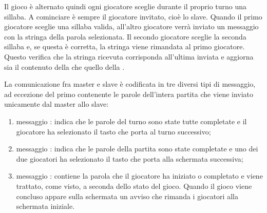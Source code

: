 
Il gioco è alternato quindi ogni giocatore sceglie durante il proprio turno una sillaba. A cominciare è sempre il giocatore invitato, cioè lo slave. Quando il primo giocatore sceglie una sillaba valida, all'altro giocatore verrà inviato un messaggio con la stringa della parola selezionata. Il secondo giocatore sceglie la seconda sillaba e, se questa è corretta, la stringa viene rimandata al primo giocatore. Questo verifica che la stringa ricevuta corrisponda all'ultima inviata e aggiorna sia il contenuto della  che quello della .

La comunicazione fra master e slave è codificata in tre diversi tipi di messaggio, ad eccezione del primo contenente le parole dell'intera partita che viene inviato unicamente dal master allo slave:

\begin{enumerate}
\item messaggio : indica che le parole del turno sono state tutte completate e il giocatore ha selezionato il tasto che porta al turno successivo;
\item messaggio : indica che le parole della partita sono state completate e uno dei due giocatori ha selezionato il tasto che porta alla schermata successiva;
\item messaggio : contiene la parola che il giocatore ha iniziato o completato e viene trattato, come visto, a seconda dello stato del gioco. Quando il gioco viene concluso appare sulla schermata un avviso che rimanda i giocatori alla schermata iniziale.
\end{enumerate}
